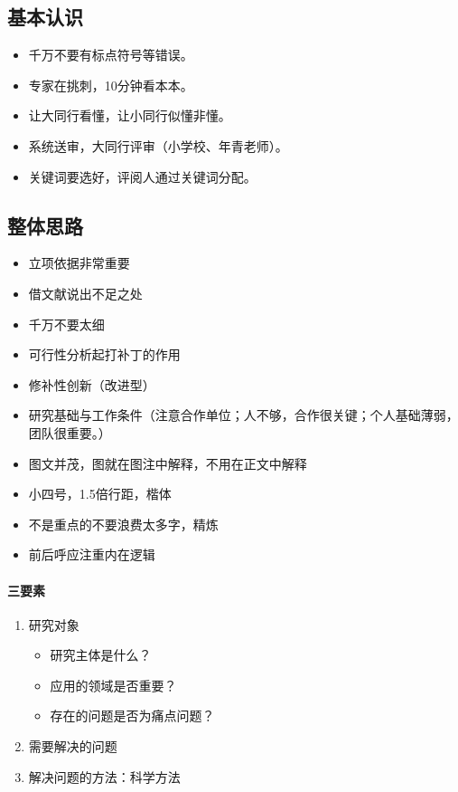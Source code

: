 \subsection{基本认识}
\begin{itemize}
\item 千万不要有标点符号等错误。
\item 专家在挑刺，10分钟看本本。
\item 让大同行看懂，让小同行似懂非懂。
\item 系统送审，大同行评审（小学校、年青老师）。
\item 关键词要选好，评阅人通过关键词分配。
\end{itemize}


\subsection{整体思路}
\begin{itemize}
\item 立项依据非常重要
\item 借文献说出不足之处
\item 千万不要太细
\item 可行性分析起打补丁的作用
\item 修补性创新（改进型）
\item 研究基础与工作条件（注意合作单位；人不够，合作很关键；个人基础薄弱，团队很重要。）
\item 图文并茂，图就在图注中解释，不用在正文中解释
\item 小四号，1.5倍行距，楷体
\item 不是重点的不要浪费太多字，精炼
\item 前后呼应注重内在逻辑
\end{itemize}


\paragraph{三要素}
\begin{enumerate}
\item 研究对象
\begin{itemize}
\item 研究主体是什么？
\item 应用的领域是否重要？
\item 存在的问题是否为痛点问题？
\end{itemize}

\item 需要解决的问题

\item 解决问题的方法：科学方法
\end{enumerate}



